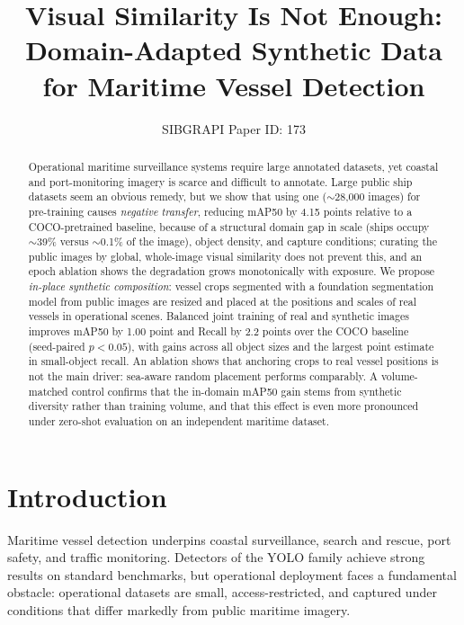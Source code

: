 \documentclass[10pt,conference]{IEEEtran}
\newif\iffinal
\newcommand{\cmtid}{173} %
\begin{document}
\title{Visual Similarity Is Not Enough: Domain-Adapted Synthetic Data \\ for Maritime Vessel Detection}

\iffinal
\author{\IEEEauthorblockN{Anonymous Authors}
\IEEEauthorblockA{Anonymous Institution}}
\else
  \author{SIBGRAPI Paper ID: \cmtid \\ }
  \linenumbers
\fi

\maketitle

\begin{abstract}
Operational maritime surveillance systems require large annotated datasets, yet
coastal and port-monitoring imagery is scarce and difficult to annotate. Large
public ship datasets seem an obvious remedy, but we show that using one
($\sim$28{,}000 images) for pre-training causes \emph{negative transfer},
reducing mAP50 by 4.15 points relative to a COCO-pretrained baseline, because of
a structural domain gap in scale (ships occupy $\sim$39\% versus $\sim$0.1\% of the
image), object density, and capture conditions; curating the public images by
global, whole-image visual similarity does not prevent this, and an epoch
ablation shows the degradation grows monotonically with exposure. We propose \emph{in-place
synthetic composition}: vessel crops segmented with a foundation segmentation
model from public images are resized and placed at the positions and scales of
real vessels in operational scenes. Balanced joint training of real and
synthetic images improves mAP50 by 1.00 point and Recall by 2.2 points over the
COCO baseline (seed-paired $p<0.05$), with gains across all object sizes and the
largest point estimate in small-object recall. An ablation
shows that anchoring crops to real vessel positions is not the main driver:
sea-aware random placement performs comparably. A volume-matched control confirms that the in-domain mAP50 gain stems from synthetic diversity rather than training volume, and that this effect is even more pronounced under zero-shot evaluation on an independent maritime dataset.
\end{abstract}

\IEEEpeerreviewmaketitle

\section{Introduction}
Maritime vessel detection underpins coastal surveillance, search and rescue,
port safety, and traffic monitoring. Detectors of the YOLO family
\cite{redmon2016you,jocher2023ultralytics} achieve strong results on standard
benchmarks, but operational deployment faces a fundamental obstacle: operational
datasets are small, access-restricted, and captured under conditions that differ
markedly from public maritime imagery.
\end{document}
